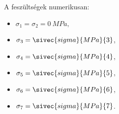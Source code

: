 \documentclass[a4paper, 12pt]{scrartcl}
\begin{document}
A feszültségek numerikusan:
\begin{multicols}{3}
  \begin{itemize}
    \item $\sigma_1 = \sigma_2 = \SI{0}{MPa},$
    \item $\sigma_3 = \sivec{sigma}{MPa}{3}$,
    \item $\sigma_4 = \sivec{sigma}{MPa}{4}$,
    \item $\sigma_5 = \sivec{sigma}{MPa}{5}$,
    \item $\sigma_6 = \sivec{sigma}{MPa}{6}$,
    \item $\sigma_7 = \sivec{sigma}{MPa}{7}$.
  \end{itemize}
\end{multicols}

\end{document}
